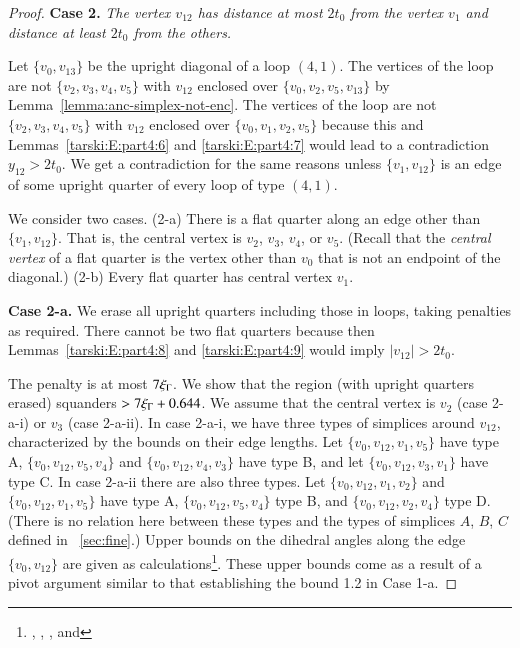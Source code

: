 \begin{proof}
\medskip

{\bf Case 2.} {\it The vertex $v_{12}$ has distance at most $2t_0$
from the vertex $v_1$ and distance at least $2t_0$ from the
others.}

Let $\{v_0,v_{13}\}$ be the upright diagonal of a loop $(4,1)$.  The
vertices of the loop are not $\{v_2,v_3,v_4,v_5\}$ with $v_{12}$
enclosed over $\{v_0,v_2,v_5,v_{13}\}$ by
Lemma~\ref{lemma:anc-simplex-not-enc}. The vertices of the loop
are not $\{v_2,v_3,v_4,v_5\}$ with $v_{12}$ enclosed over
$\{v_0,v_1,v_2,v_5\}$ because this and Lemmas~\ref{tarski:E:part4:6}
and \ref{tarski:E:part4:7} would lead to a contradiction
$y_{12}>2t_0$. 
We get a contradiction for the same reasons
 unless $\{v_1,v_{12}\}$ is an edge of some
upright quarter of every loop of type $(4,1)$.

We consider two cases.  (2-a) There is a flat quarter along an
edge other than $\{v_1,v_{12}\}$.  That is, the central vertex is
$v_2$, $v_3$, $v_4$, or $v_5$.  (Recall that the {\it central
vertex} of a flat quarter is the vertex other than $v_0$ that
is not an endpoint of the diagonal.) (2-b) Every flat quarter has
central vertex $v_1$.

{\bf Case 2-a.}  We erase all upright quarters including those in
loops, taking penalties as required. There cannot be two flat
quarters because then Lemmas~\ref{tarski:E:part4:8} and
\ref{tarski:E:part4:9} would imply $|v_{12}|>2t_0$.

The penalty is at most $7\xi_\Gamma$.  We show that the region (with
upright quarters erased) squanders $>7\xi_\Gamma+0.644$.  We assume that
the central vertex is $v_2$ (case 2-a-i) or $v_3$ (case 2-a-ii).
In case 2-a-i, we have three types of simplices around $v_{12}$,
characterized by the bounds on their edge lengths.  Let
$\{v_0,v_{12},v_1,v_5\}$ have type A, $\{v_0,v_{12},v_5,v_4\}$ and
$\{v_0,v_{12},v_4,v_3\}$ have type B, and let $\{v_0,v_{12},v_3,v_1\}$
have type C.  In case 2-a-ii there are also three types.  Let
$\{v_0,v_{12},v_1,v_2\}$ and $\{v_0,v_{12},v_1,v_5\}$ have type A,
$\{v_0,v_{12},v_5,v_4\}$ type B, and $\{v_0,v_{12},v_2,v_4\}$ type D.
(There is no relation here between these types and the types of
simplices $A$, $B$, $C$ defined in \Chap~\ref{sec:fine}.) Upper
bounds on the dihedral angles along the edge $\{v_0,v_{12}\}$ are
given as calculations\footnote{, ,
, and }. These upper bounds come
as a result of a pivot argument similar to that establishing the
bound 1.2 in Case 1-a.


\end{proof}
